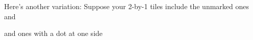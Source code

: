 Here's another variation:
Suppose your 2-by-1 tiles include the unmarked ones and

and ones with a dot at one side

